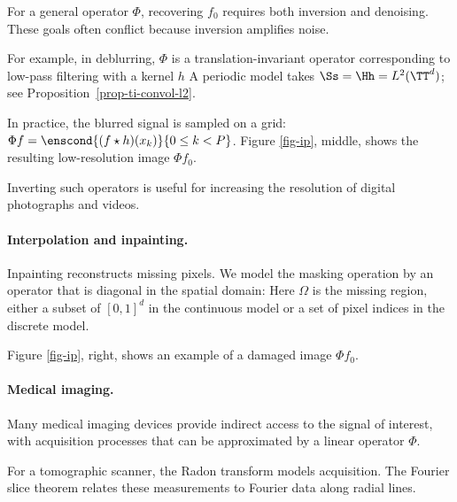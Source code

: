 For a general operator $\Phi$, recovering $f_0$ requires both inversion and denoising. These goals often conflict because inversion amplifies noise.
 
For example, in deblurring, $\Phi$ is a translation-invariant operator corresponding to low-pass filtering with a kernel $h$
A periodic model takes $\Ss=\Hh=L^2(\TT^d)$; see Proposition~\ref{prop-ti-convol-l2}.
 
In practice, the blurred signal is sampled on a grid: $\Phi f = \enscond{(f \star h)(x_k)}{0 \leq k< P}$. Figure \ref{fig-ip}, middle, shows the resulting low-resolution image $\Phi f_0$.
 
Inverting such operators is useful for increasing the resolution of digital photographs and videos.


   
\paragraph{Interpolation and inpainting.}

Inpainting reconstructs missing pixels. We model the masking operation by an operator that is diagonal in the spatial domain:
Here $\Omega$ is the missing region, either a subset of $[0,1]^d$ in the continuous model or a set of pixel indices in the discrete model.
 
Figure \ref{fig-ip}, right, shows an example of a damaged image $\Phi f_0$.



   
\paragraph{Medical imaging.}

Many medical imaging devices provide indirect access to the signal of interest, with acquisition processes that can be approximated by a linear operator $\Phi$.
 
For a tomographic scanner, the Radon transform models acquisition. The Fourier slice theorem relates these measurements to Fourier data along radial lines.
  
